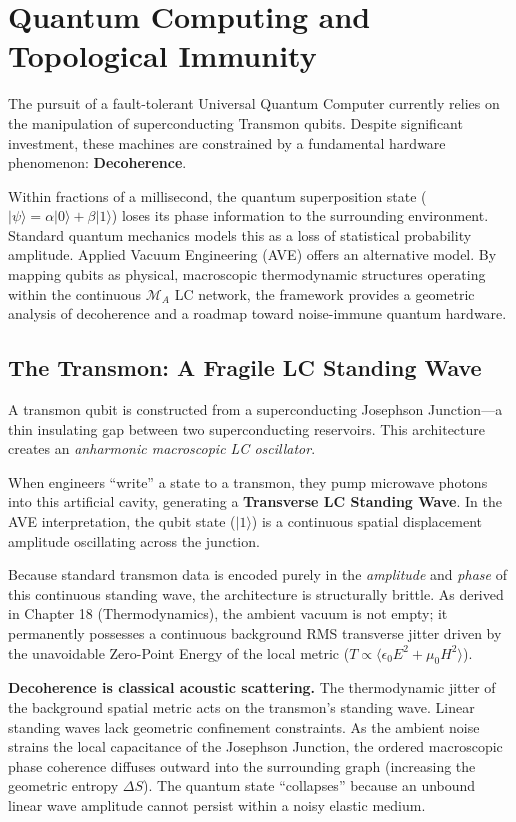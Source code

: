 \chapter{Quantum Computing and Topological Immunity}
\label{ch:quantum_computing}

The pursuit of a fault-tolerant Universal Quantum Computer currently relies on the manipulation of superconducting Transmon qubits. Despite significant investment, these machines are constrained by a fundamental hardware phenomenon: \textbf{Decoherence}. 

Within fractions of a millisecond, the quantum superposition state ($|\psi\rangle = \alpha|0\rangle + \beta|1\rangle$) loses its phase information to the surrounding environment. Standard quantum mechanics models this as a loss of statistical probability amplitude. Applied Vacuum Engineering (AVE) offers an alternative model. By mapping qubits as physical, macroscopic thermodynamic structures operating within the continuous $\mathcal{M}_A$ LC network, the framework provides a geometric analysis of decoherence and a roadmap toward noise-immune quantum hardware.

\section{The Transmon: A Fragile LC Standing Wave}
A transmon qubit is constructed from a superconducting Josephson Junction---a thin insulating gap between two superconducting reservoirs. This architecture creates an \textit{anharmonic macroscopic LC oscillator}. 

When engineers ``write'' a state to a transmon, they pump microwave photons into this artificial cavity, generating a \textbf{Transverse LC Standing Wave}. In the AVE interpretation, the qubit state ($|1\rangle$) is a continuous spatial displacement amplitude oscillating across the junction.

Because standard transmon data is encoded purely in the \textit{amplitude} and \textit{phase} of this continuous standing wave, the architecture is structurally brittle. As derived in Chapter 18 (Thermodynamics), the ambient vacuum is not empty; it permanently possesses a continuous background RMS transverse jitter driven by the unavoidable Zero-Point Energy of the local metric ($T \propto \langle \epsilon_0 E^2 + \mu_0 H^2 \rangle$).

\textbf{Decoherence is classical acoustic scattering.} The thermodynamic jitter of the background spatial metric acts on the transmon's standing wave. Linear standing waves lack geometric confinement constraints. As the ambient noise strains the local capacitance of the Josephson Junction, the ordered macroscopic phase coherence diffuses outward into the surrounding graph (increasing the geometric entropy $\Delta S$). The quantum state ``collapses'' because an unbound linear wave amplitude cannot persist within a noisy elastic medium.


